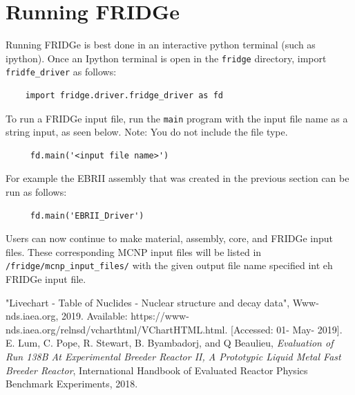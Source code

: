 \documentclass{article}
\begin{document}
\section{Running FRIDGe}

Running FRIDGe is best done in an interactive python terminal (such as ipython). Once an Ipython terminal is open in the \verb|fridge| directory, import \verb|fridfe_driver| as follows:
\begin{verbatim}
    import fridge.driver.fridge_driver as fd
\end{verbatim}
To run a FRIDGe input file, run the \verb|main| program with the input file name as a string input, as seen below. Note: You do not include the file type.
\begin{verbatim}
     fd.main('<input file name>')
\end{verbatim}
For example the EBRII assembly that was created in the previous section can be run as follows:
\begin{verbatim}
     fd.main('EBRII_Driver')
\end{verbatim}
Users can now continue to make material, assembly, core, and FRIDGe input files. These corresponding MCNP input files will be listed in \verb|/fridge/mcnp_input_files/| with the given output file name specified int eh FRIDGe input file.

\begin{thebibliography}{}
    "Livechart - Table of Nuclides - Nuclear structure and decay data", Www-nds.iaea.org, 2019. Available: https://www-nds.iaea.org/relnsd/vcharthtml/VChartHTML.html. [Accessed: 01- May- 2019].
    E. Lum, C. Pope, R. Stewart, B. Byambadorj, and Q Beaulieu,
    \emph{Evaluation of Run 138B At Experimental Breeder Reactor II, A Prototypic Liquid Metal Fast Breeder Reactor},
    International Handbook of Evaluated Reactor Physics Benchmark Experiments,
    2018.

\end{thebibliography}
\end{document}
